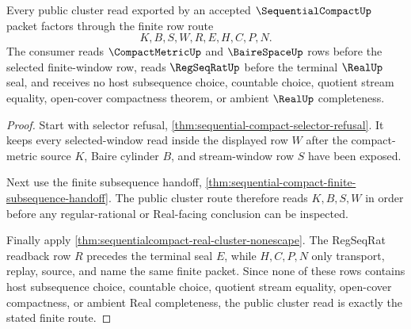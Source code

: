 \begin{theorem}
\label{thm:sequential-compact-public-finite-cluster-route}
Every public cluster read exported by an accepted $\SequentialCompactUp$ packet factors through the finite row route
$$
K,B,S,W,R,E,H,C,P,N .
$$
The consumer reads $\CompactMetricUp$ and $\BaireSpaceUp$ rows before the selected finite-window row, reads $\RegSeqRatUp$ before the terminal $\RealUp$ seal, and receives no host subsequence choice, countable choice, quotient stream equality, open-cover compactness theorem, or ambient $\RealUp$ completeness.
\end{theorem}
\begin{proof}
Start with selector refusal, \autoref{thm:sequential-compact-selector-refusal}. It keeps every selected-window read inside the displayed row $W$ after the compact-metric source $K$, Baire cylinder $B$, and stream-window row $S$ have been exposed.

Next use the finite subsequence handoff, \autoref{thm:sequential-compact-finite-subsequence-handoff}. The public cluster route therefore reads $K,B,S,W$ in order before any regular-rational or Real-facing conclusion can be inspected.

Finally apply \autoref{thm:sequentialcompact-real-cluster-nonescape}. The RegSeqRat readback row $R$ precedes the terminal seal $E$, while $H,C,P,N$ only transport, replay, source, and name the same finite packet. Since none of these rows contains host subsequence choice, countable choice, quotient stream equality, open-cover compactness, or ambient Real completeness, the public cluster read is exactly the stated finite route.
\end{proof}

